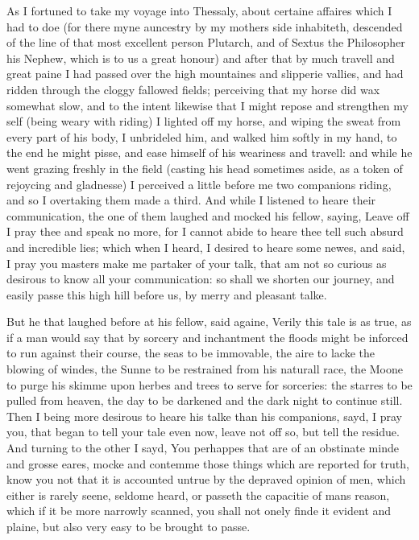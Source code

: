 As I fortuned to take my voyage into Thessaly, about certaine affaires which I
had to doe (for there myne auncestry by my mothers side inhabiteth, descended
of the line of that most excellent person Plutarch, and of Sextus the
Philosopher his Nephew, which is to us a great honour) and after that by much
travell and great paine I had passed over the high mountaines and slipperie
vallies, and had ridden through the cloggy fallowed fields; perceiving that my
horse did wax somewhat slow, and to the intent likewise that I might repose and
strengthen my self (being weary with riding) I lighted off my horse, and wiping
the sweat from every part of his body, I unbrideled him, and walked him softly
in my hand, to the end he might pisse, and ease himself of his weariness and
travell: and while he went grazing freshly in the field (casting his head
sometimes aside, as a token of rejoycing and gladnesse) I perceived a little
before me two companions riding, and so I overtaking them made a third. And
while I listened to heare their communication, the one of them laughed and
mocked his fellow, saying, Leave off I pray thee and speak no more, for I
cannot abide to heare thee tell such absurd and incredible lies; which when I
heard, I desired to heare some newes, and said, I pray you masters make me
partaker of your talk, that am not so curious as desirous to know all your
communication: so shall we shorten our journey, and easily passe this high hill
before us, by merry and pleasant talke.

But he that laughed before at his fellow, said againe, Verily this tale is as
true, as if a man would say that by sorcery and inchantment the floods might be
inforced to run against their course, the seas to be immovable, the aire to
lacke the blowing of windes, the Sunne to be restrained from his naturall race,
the Moone to purge his skimme upon herbes and trees to serve for sorceries: the
starres to be pulled from heaven, the day to be darkened and the dark night to
continue still. Then I being more desirous to heare his talke than his
companions, sayd, I pray you, that began to tell your tale even now, leave not
off so, but tell the residue. And turning to the other I sayd, You perhappes
that are of an obstinate minde and grosse eares, mocke and contemme those
things which are reported for truth, know you not that it is accounted untrue
by the depraved opinion of men, which either is rarely seene, seldome heard, or
passeth the capacitie of mans reason, which if it be more narrowly scanned, you
shall not onely finde it evident and plaine, but also very easy to be brought
to passe.

